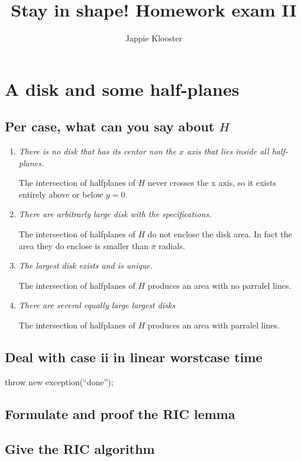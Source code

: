 \documentclass{article}
\begin{document}
\author{Jappie Klooster}
\title{Stay in shape! Homework exam II}
\maketitle
\section{A disk and some half-planes}
\subsection{Per case, what can you say about $H$}
\begin{enumerate}[i]
	\item \emph{There is no disk that has its centor non the $x$ axis
			that lies inside all half-planes.}

		The intersection of halfplanes of $H$ never crosses the x axis,
		so it exists entirely above or below $y=0$.

	\item \emph{There are arbitrarly large disk with the specifications.}

		The intersection of halfplanes of $H$ do not enclose the disk
		area.
		In fact the area they do enclose is smaller than $\pi$ radials.

	\item \emph{The largest disk exists and is unique.}

		The intersection of halfplanes of $H$ produces an area with no
		parralel lines.

	\item \emph{There are several equally large largest disks}

		The intersection of halfplanes of $H$ produces an area with
		parralel lines.

\end{enumerate}

\subsection{Deal with case ii in linear worstcase time}
throw new exception(``done'');
\subsection{Formulate and proof the RIC lemma}
\subsection{Give the RIC algorithm}
\end{document}
